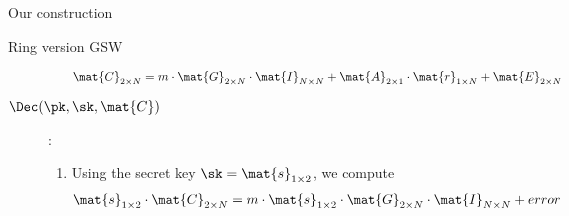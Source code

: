 \begin{section}{Our construction}
\begin{subsection}{Ring version GSW~\cite{DBLP:journals/tc/KhedrGV16}}
\begin{description}
\begin{enumerate}
        \begin{align}
          \mat{C}_{2 \times N} &= m \cdot \mat{G}_{2 \times N} \cdot \mat{I}_{N \times N} + \mat{A}_{2 \times 1} \cdot \mat{r}_{1 \times N} + \mat{E}_{2 \times N}
        \end{align}
      \end{enumerate}
    \item[$\Dec(\pk, \sk, \mat{C})$]:
      \begin{enumerate}
    \item Using the secret key $\sk = \mat{s}_{1 \times 2}$, we compute
      \begin{align*}
        \mat{s}_{1 \times 2} \cdot \mat{C}_{2 \times N} &= m \cdot \mat{s}_{1 \times 2} \cdot \mat{G}_{2 \times N} \cdot \mat{I}_{N \times N} + error
      \end{align*}
      \end{enumerate}
    \end{description}
  \end{subsection}



\end{section}
